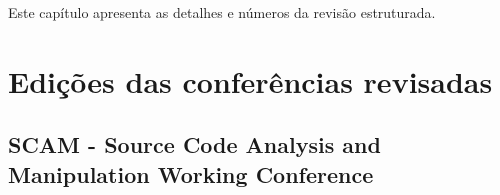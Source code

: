 {Este capítulo apresenta as detalhes e números da revisão estruturada.}
\label{apendice-revisao-estruturada}

\section{Edições das conferências revisadas}
\label{edicoes-conferencias}

%
%
%

\subsection{SCAM - Source Code Analysis and Manipulation Working Conference}


